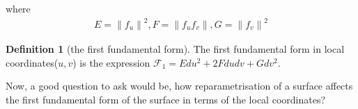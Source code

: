\documentclass{article}
\theoremstyle{plain}
\theoremstyle{definition}
\newtheorem{definition}{Definition}
\theoremstyle{remark}
\begin{document}

where
\begin{align}
    E = \left\lVert f_u \right\rVert ^2, F = \left\lVert f_u f_v\right\rVert ,  G = \left\lVert
    f_v \right\rVert ^2
\end{align}

\begin{definition}[the first fundamental form]
    The first fundamental form in local coordinates(\(u,v\)) is the expression \(\mathcal{F}_1 =  E du^2 + 2F du dv + G dv^2 \).
\end{definition}

Now, a good question to ask would be, how reparametrisation of a surface affects the first fundamental form of the surface in terms of the local coordinates?
\end{document}
